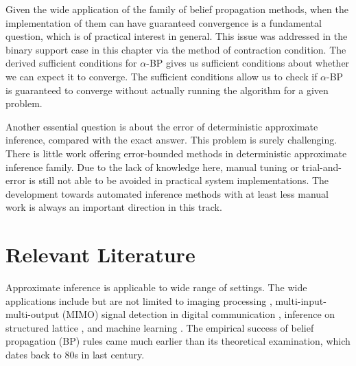 Given the wide application of the family of belief propagation methods, when the implementation of them can have guaranteed convergence is a fundamental question, which is of practical interest in general. This issue was addressed in the binary support case in this chapter via the method of contraction condition. The derived sufficient conditions for $\alpha$-BP gives us sufficient conditions about whether we can expect it to converge. The sufficient conditions allow us to check if $\alpha$-BP is guaranteed to converge without actually running the algorithm for a given problem.

Another essential question is about the error of deterministic approximate inference, compared with the exact answer. This problem is surely challenging. There is little work offering error-bounded methods in deterministic approximate inference family. Due to the lack of knowledge here, manual tuning or trial-and-error is still not able to be avoided in practical system implementations. The development towards automated inference methods with at least less manual work is always an important direction in this track. 

\section{Relevant Literature}
\label{chpt3:sec:literature}
Approximate inference is applicable to wide range of settings. The wide applications include but are not limited to imaging processing \cite{zhang2013denoise}, multi-input-multi-output (MIMO) signal detection in digital communication \cite{cespedes2014ep,jeon2015optimality}, inference on structured lattice \cite{10.2307/25651244}, and machine learning \cite{2018arXiv180607066M, Lin:2015:DLM:2969239.2969280, yoon2019inferenceGraph}. The empirical success of  belief propagation (BP) rules came much earlier than its theoretical examination, which dates back to $80$s in last century\cite{pearl1986b}.

